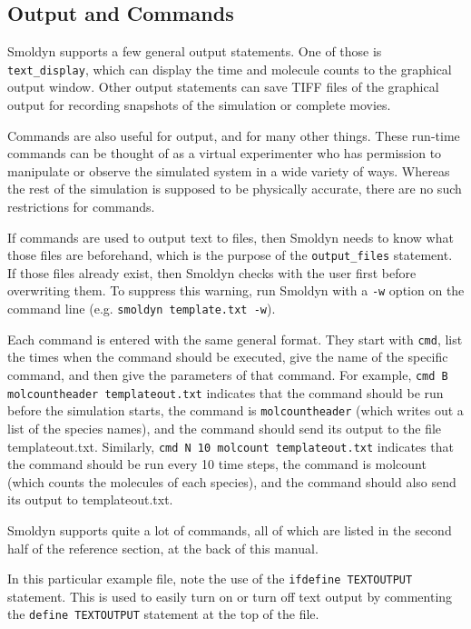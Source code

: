 \documentclass {book}
\newcommand {\ttt} {\texttt}
\begin{document}
\subsection*{Output and Commands}

Smoldyn supports a few general output statements. One of those is  \ttt{text\_display}, which can display the time and molecule counts to the graphical output window. Other output statements can save TIFF files of the graphical output for recording snapshots of the simulation or complete movies.

Commands are also useful for output, and for many other things. These run-time commands can be thought of as a virtual experimenter who has permission to manipulate or observe the simulated system in a wide variety of ways. Whereas the rest of the simulation is supposed to be physically accurate, there are no such restrictions for commands.

If commands are used to output text to files, then Smoldyn needs to know what those files are beforehand, which is the purpose of the  \ttt{output\_files} statement. If those files already exist, then Smoldyn checks with the user first before overwriting them. To suppress this warning, run Smoldyn with a  \ttt{-w} option on the command line (e.g.  \ttt{smoldyn template.txt -w}).

Each command is entered with the same general format. They start with  \ttt{cmd}, list the times when the command should be executed, give the name of the specific command, and then give the parameters of that command. For example,  \ttt{cmd B molcountheader templateout.txt} indicates that the command should be run before the simulation starts, the command is  \ttt{molcountheader} (which writes out a list of the species names), and the command should send its output to the file templateout.txt. Similarly,  \ttt{cmd N 10 molcount templateout.txt} indicates that the command should be run every 10 time steps, the command is molcount (which counts the molecules of each species), and the command should also send its output to templateout.txt.

Smoldyn supports quite a lot of commands, all of which are listed in the second half of the reference section, at the back of this manual.

In this particular example file, note the use of the  \ttt{ifdefine TEXTOUTPUT} statement. This is used to easily turn on or turn off text output by commenting the  \ttt{define TEXTOUTPUT} statement at the top of the file.
\end{document}
